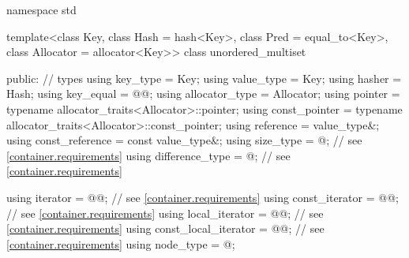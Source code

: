 %
\begin{codeblock}
namespace std {
  template<class Key,
           class Hash = hash<Key>,
           class Pred = equal_to<Key>,
           class Allocator = allocator<Key>>
  class unordered_multiset {
  public:
    // types
    using key_type             = Key;
    using value_type           = Key;
    using hasher               = Hash;
    using key_equal            = @@;
    using allocator_type       = Allocator;
    using pointer              = typename allocator_traits<Allocator>::pointer;
    using const_pointer        = typename allocator_traits<Allocator>::const_pointer;
    using reference            = value_type&;
    using const_reference      = const value_type&;
    using size_type            = @\impdef@; // see \ref{container.requirements}
    using difference_type      = @\impdef@; // see \ref{container.requirements}

    using iterator             = @@; // see \ref{container.requirements}
    using const_iterator       = @@; // see \ref{container.requirements}
    using local_iterator       = @@; // see \ref{container.requirements}
    using const_local_iterator = @@; // see \ref{container.requirements}
    using node_type            = @\unspec@;

}}
\end{codeblock}
